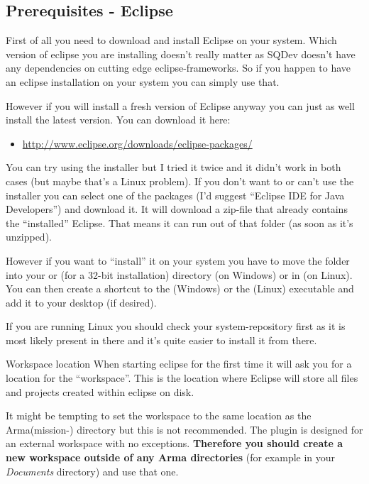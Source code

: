 \documentclass[twoside=false]{scrbook}
\newcommand{\SQDev}{SQDev\xspace}
\newcommand{\eclipse}{Eclipse\xspace}
\newcommand{\arma}{Arma\xspace}
\begin{document}
	\subsection{Prerequisites - \eclipse}
	First of all you need to download and install \eclipse on your system. Which version of eclipse you are installing doesn't really matter as \SQDev doesn't have any dependencies on cutting edge eclipse-frameworks. So if you happen to have an eclipse installation on your system you can simply use that.
	
	However if you will install a fresh version of \eclipse anyway you can just as well install the latest version. You can download it here:
	\begin{itemize}
		\item  \href{http://www.eclipse.org/downloads/eclipse-packages/}{http://www.eclipse.org/downloads/eclipse-packages/}
	\end{itemize}
	
	You can try using the installer but I tried it twice and it didn't work in both cases (but maybe that's a Linux problem). If you don't want to or can't use the installer you can select one of the packages (I'd suggest “Eclipse IDE for Java Developers”) and download it. It will download a zip-file that already contains the “installed” \eclipse. That means it can run out of that folder (as soon as it's unzipped).
	
	However if you want to “install” it on your system you have to move the folder into your  or  (for a 32-bit installation) directory (on Windows) or in  (on Linux). You can then create a shortcut to the  (Windows) or the  (Linux) executable and add it to your desktop (if desired).
	
	If you are running Linux you should check your system-repository first as it is most likely present in there and it's quite easier to install it from there.
	
	\begin{important}{Workspace location}
		When starting eclipse for the first time it will ask you for a location for the “workspace”. This is the location where \eclipse will store all files and projects created within eclipse on disk.
		
		It might be tempting to set the workspace to the same location as the \arma (mission-) directory but this is not recommended. The plugin is designed for an external workspace with no exceptions. \textbf{Therefore you should create a new workspace outside of any \arma directories} (for example in your \emph{Documents} directory) and use that one.
	\end{important}
	
\end{document}
